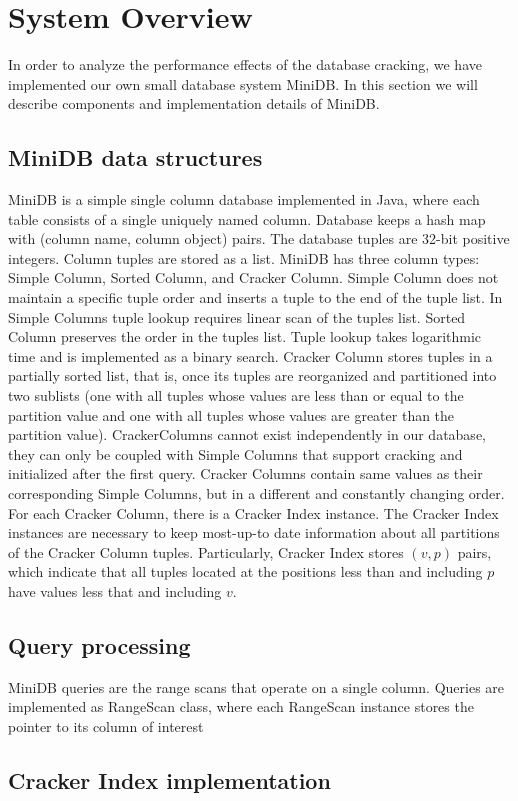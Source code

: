 \section{System Overview}
In  order to analyze the performance effects of the database cracking, we have implemented our own small database system MiniDB. In this section we will describe components and implementation details of MiniDB.
\label{sec:system}

\subsection{MiniDB data structures}
MiniDB is a simple single column database implemented in Java, where each table consists of a single uniquely named column. Database keeps a hash map with (column name, column object) pairs. The database tuples are 32-bit positive integers. Column tuples are stored as a list. MiniDB has three column types: Simple Column, Sorted Column, and Cracker Column. Simple Column does not maintain a specific tuple order and inserts a tuple to the end of the tuple list. In Simple Columns tuple lookup requires linear scan of the tuples list. Sorted Column preserves the order in the tuples list. Tuple lookup takes logarithmic time and is implemented as a binary search. Cracker Column stores tuples in a partially sorted list, that is, once its tuples are reorganized and partitioned into two sublists (one with all tuples whose values are less than or equal to the partition value and one with all tuples whose values are greater than the partition value). CrackerColumns cannot exist independently in our database, they can only be coupled with Simple Columns that support cracking and initialized after the first query. Cracker Columns contain same values as their corresponding Simple Columns, but in a different and constantly changing order. For each Cracker Column, there is a Cracker Index instance. The Cracker Index instances are necessary to keep most-up-to date information about all partitions of the Cracker Column tuples. Particularly, Cracker Index stores $(v, p)$ pairs, which indicate that all tuples located at the positions less than and including $p$ have values less that and including $v$.
\subsection{Query processing}
MiniDB queries are the range scans that operate on a single column. Queries are implemented as RangeScan class, where each RangeScan instance stores the pointer to its column of interest
\subsection{Cracker Index implementation}
